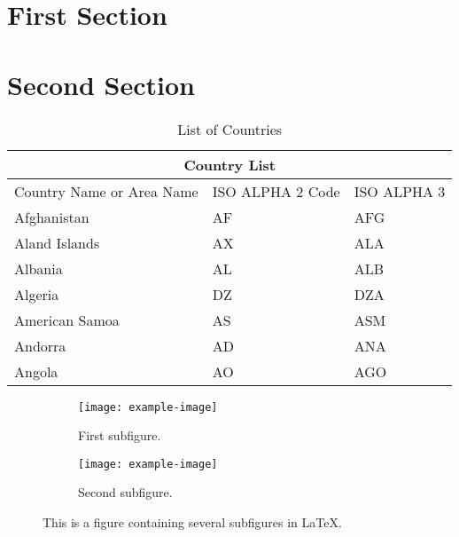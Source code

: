 \documentclass{article}
\begin{document}


\tableofcontents
\listoftables
\listoffigures
\newpage

\section{First Section} 


\section{Second Section} 
\begin{table}[h] %
    \caption{List of Countries} %
\begin{tabularx}{\textwidth}{|X|X|X|} 

\hline
\multicolumn{3}{|c|}{Country List}   \\ \hline
Country Name or Area Name & ISO ALPHA 2 Code & ISO ALPHA 3 \\ \hline
Afghanistan & AF & AFG \\
Aland Islands & AX & ALA \\
Albania & AL & ALB \\
Algeria & DZ & DZA \\
American Samoa & AS & ASM \\
Andorra & AD & ANA \\
Angola & AO & AGO \\
\hline

\end{tabularx}
\end{table}

\begin{figure}
\centering
\begin{subfigure}{0.45\textwidth}
    \texttt{[image: example-image]}
    \caption{First subfigure.}
    \label{first}
\end{subfigure}
\hfill
\vspace{1em}
\begin{subfigure}{0.45\textwidth}
    \texttt{[image: example-image]}
    \caption{Second subfigure.}
    \label{second}
\end{subfigure}

        
\caption{This is a figure containing several subfigures in \LaTeX.}
\label{figures}

\end{figure}
\end{document}
